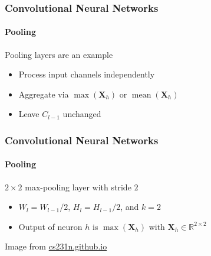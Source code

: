 \documentclass[xetex,professionalfont]{beamer}
\renewcommand\emph[1]{\textcolor{tuwcvl_cvl_blue}{#1}}
\newcommand{\RR}{\mathbb{R}}
\renewcommand{\vec}[1]{\ensuremath{\mathbf{#1}}}
\newcommand{\vX}{\vec{X}}
\DeclareMathOperator*{\mean}{mean}
\begin{document}
\begin{frame}
\frametitle{Convolutional Neural Networks}
\framesubtitle{Pooling}

\emph{Pooling layers} are an example
\begin{itemize}
    \item Process input channels independently %
    \item Aggregate via $\max(\vX_h)$ or $\mean(\vX_h)$
    \item Leave $C_{l-1}$ unchanged
\end{itemize}

\end{frame}


\begin{frame}
\frametitle{Convolutional Neural Networks}
\framesubtitle{Pooling}

$2\times2$ \emph{max-pooling} layer with \emph{stride} $2$
\begin{itemize}
    \item $W_l=W_{l-1}/2$, $H_l=H_{l-1}/2$, and $k=2$
    \item Output of neuron $h$ is $\max(\vX_h)$ with $\vX_h\in\RR^{2\times2}$
\end{itemize}

\smallskip

\begin{center}
    {\centering Image from \href{https://cs231n.github.io/convolutional-networks/}{cs231n.github.io}}
\end{center}

\end{frame}
\end{document}
